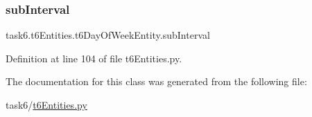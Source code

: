 \subsubsection{\texorpdfstring{sub\+Interval}{subInterval}}
{\footnotesize\ttfamily task6.\+t6\+Entities.\+t6\+Day\+Of\+Week\+Entity.\+sub\+Interval}



Definition at line 104 of file t6\+Entities.\+py.



The documentation for this class was generated from the following file\+:\begin{DoxyCompactItemize}
\item 
task6/\hyperlink{t6Entities_8py}{t6\+Entities.\+py}\end{DoxyCompactItemize}
